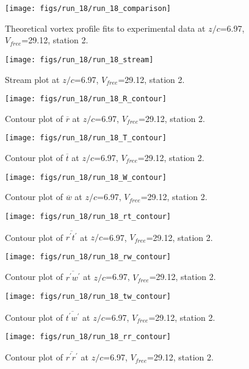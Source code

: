 \begin{figure}[H]
\centering
\texttt{[image: figs/run\_18/run\_18\_comparison]}
\caption{Theoretical vortex profile fits to experimental data at $z/c$=6.97, $V_{free}$=29.12, station 2.}
\end{figure}


\begin{figure}[H]
\centering
\texttt{[image: figs/run\_18/run\_18\_stream]}
\caption{Stream plot at $z/c$=6.97, $V_{free}$=29.12, station 2.}
\end{figure}


\begin{figure}[H]
\centering
\texttt{[image: figs/run\_18/run\_18\_R\_contour]}
\caption{Contour plot of $\overline{r}$ at $z/c$=6.97, $V_{free}$=29.12, station 2.}
\end{figure}


\begin{figure}[H]
\centering
\texttt{[image: figs/run\_18/run\_18\_T\_contour]}
\caption{Contour plot of $\overline{t}$ at $z/c$=6.97, $V_{free}$=29.12, station 2.}
\end{figure}


\begin{figure}[H]
\centering
\texttt{[image: figs/run\_18/run\_18\_W\_contour]}
\caption{Contour plot of $\overline{w}$ at $z/c$=6.97, $V_{free}$=29.12, station 2.}
\end{figure}


\begin{figure}[H]
\centering
\texttt{[image: figs/run\_18/run\_18\_rt\_contour]}
\caption{Contour plot of $\overline{r^\prime t^\prime}$ at $z/c$=6.97, $V_{free}$=29.12, station 2.}
\end{figure}


\begin{figure}[H]
\centering
\texttt{[image: figs/run\_18/run\_18\_rw\_contour]}
\caption{Contour plot of $\overline{r^\prime w^\prime}$ at $z/c$=6.97, $V_{free}$=29.12, station 2.}
\end{figure}


\begin{figure}[H]
\centering
\texttt{[image: figs/run\_18/run\_18\_tw\_contour]}
\caption{Contour plot of $\overline{t^\prime w^\prime}$ at $z/c$=6.97, $V_{free}$=29.12, station 2.}
\end{figure}


\begin{figure}[H]
\centering
\texttt{[image: figs/run\_18/run\_18\_rr\_contour]}
\caption{Contour plot of $\overline{r^\prime r^\prime}$ at $z/c$=6.97, $V_{free}$=29.12, station 2.}
\end{figure}


